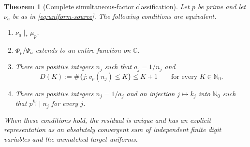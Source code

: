 \documentclass[11pt,a4paper]{article}
\newtheorem{theorem}{Theorem}[section]
\theoremstyle{remark}
\newcommand{\C}{\mathbb C}
\newcommand{\Nzero}{\mathbb N_0}
\begin{document}
\begin{theorem}[Complete simultaneous-factor classification]
\label{thm:hall}
Let $p$ be prime and let $\nu_a$ be as in \eqref{eq:uniform-source}. The following
conditions are equivalent.
\begin{enumerate}[label=\textup{(\roman*)}]
\item $\nu_a\mid_*\mu_p$.
\item $\Phi_p/\Psi_a$ extends to an entire function on $\C$.
\item There are positive integers $n_j$ such that $a_j=1/n_j$ and
\begin{equation}
 D(K):=\#\{j:v_p(n_j)\le K\}\le K+1
 \qquad\text{for every }K\in\Nzero.
 \label{eq:hall}
\end{equation}
\item There are positive integers $n_j=1/a_j$ and an injection
$j\mapsto k_j$ into $\Nzero$ such that $p^{k_j}\mid n_j$ for every $j$.
\end{enumerate}
When these conditions hold, the residual is unique and has an explicit
representation as an absolutely convergent sum of independent finite digit
variables and the unmatched target uniforms.
\end{theorem}
\end{document}
